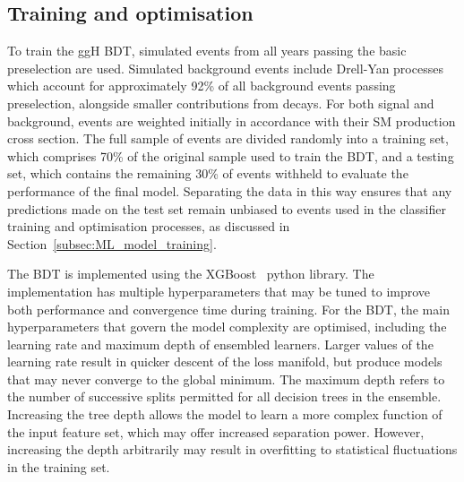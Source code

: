 \subsection{Training and optimisation}

To train the ggH BDT,  simulated \ggH events from all years passing the basic preselection are used.
Simulated background events include Drell-Yan processes which account for approximately 92\% of all background events passing preselection, alongside smaller contributions from \ttbar decays.
For both signal and background, events are weighted initially in accordance with their SM production cross section. 
The full sample of events are divided randomly into a training set, which comprises 70\% of the original sample used to train the BDT, and a testing set, which contains the remaining 30\% of events withheld to evaluate the performance of the final model. Separating the data in this way ensures that any predictions made on the test set remain unbiased to events used in the classifier training and optimisation processes, as discussed in Section~\ref{subsec:ML_model_training}.


The BDT is implemented using the XGBoost~\cite{xgboost} python library. The implementation has multiple hyperparameters that may be tuned to improve both performance and convergence time during training. For the \ggH BDT, the main hyperparameters that govern the model complexity are optimised, including the learning rate and maximum depth of ensembled learners. Larger values of the learning rate result in quicker descent of the loss manifold, but produce models that may never converge to the global minimum. The maximum depth refers to the number of successive splits permitted for all decision trees in the ensemble. Increasing the tree depth allows the model to learn a more complex function of the input feature set, which may offer increased separation power. However, increasing the depth arbitrarily may result in overfitting to statistical fluctuations in the training set. 

